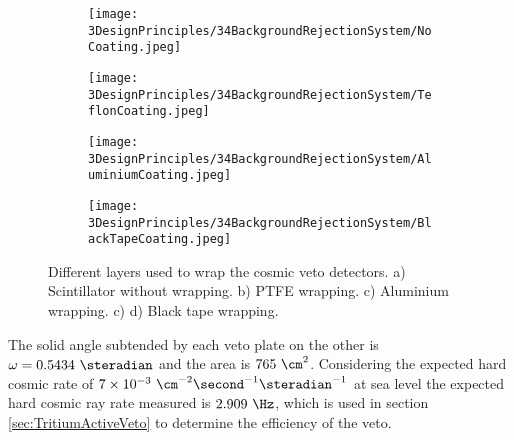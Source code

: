 \begin{figure}[h]
\centering
    \begin{subfigure}[b]{0.23\textwidth}
    \centering
    \texttt{[image: 3DesignPrinciples/34BackgroundRejectionSystem/NoCoating.jpeg]}  
    \caption{\label{subfig:PlasticScintillatorNoCoating}}
    \end{subfigure}
    \hfill
    \begin{subfigure}[b]{0.23\textwidth}
    \centering
    \texttt{[image: 3DesignPrinciples/34BackgroundRejectionSystem/TeflonCoating.jpeg]}  
    \caption{\label{subfig:PlasticScintillatorTeflon}}
    \end{subfigure}
    \hfill
    \begin{subfigure}[b]{0.23\textwidth}
    \centering
    \texttt{[image: 3DesignPrinciples/34BackgroundRejectionSystem/AluminiumCoating.jpeg]}  
    \caption{\label{subfig:PlasticScintillatorAluminium}}
    \end{subfigure}
    \hfill
    \begin{subfigure}[b]{0.23\textwidth}
    \centering
    \texttt{[image: 3DesignPrinciples/34BackgroundRejectionSystem/BlackTapeCoating.jpeg]}  
    \caption{\label{subfig:PlasticScintillatorBlackTape}}
    \end{subfigure}
 \caption{Different layers used to wrap the cosmic veto detectors. a) Scintillator without wrapping. b) PTFE wrapping. c) Aluminium wrapping. c) d) Black tape wrapping.}
 \label{fig:LayersVeto}
\end{figure}

The solid angle subtended by each veto plate on the other is $\omega=0.5434~\steradian$ and the area is $765~\cm^2$. Considering the expected hard cosmic rate of $7 \times 10^{-3}~\cm^{-2}\second^{-1}\steradian^{-1}$ at sea level the expected hard cosmic ray rate measured is $2.909~\Hz$, which is used in section \ref{sec:TritiumActiveVeto} to determine the efficiency of the veto.